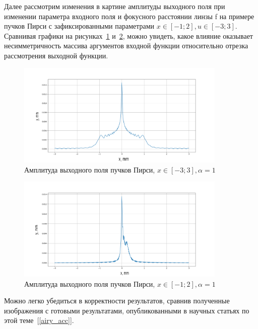 {    Далее рассмотрим изменения в картине амплитуды выходного поля при
    изменении параметра входного поля и фокусного расстоянии линзы f на
    примере пучков Пирси с зафиксированными параметрами $x \in [-1; 2], u \in [-3; 3]$.
    Сравнивая графики на рисунках~\ref{pearceyoutput} и~\ref{pearceyoutput1}, можно увидеть, какое влияние
    оказывает несимметричность массива аргументов входной функции
    относительно отрезка рассмотрения выходной функции.

    \begin{figure}[H]
        \begin{center}
            \includegraphics[width=10cm]{plots/pearceyoutput}
            \caption{Амплитуда выходного поля пучков Пирси, $x \in [-3; 3], \alpha  = 1$}
            \label{pearceyoutput}
        \end{center}

    \end{figure}

    \begin{figure}[H]
        \begin{center}
            \includegraphics[width=10cm]{plots/pearceyoutput1}
            \caption{Амплитуда выходного поля пучков Пирси, $x \in [-1; 2], \alpha  = 1$}
            \label{pearceyoutput1}
        \end{center}

    \end{figure}


    Можно легко убедиться в корректности результатов, сравнив полученные
    изображения с готовыми результатами, опубликованными в научных статьях по
    этой теме~[\ref{airy_acc}].

}
